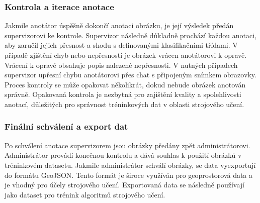 
\subsubsection{Kontrola a iterace anotace}
Jakmile anotátor úspěšně dokončí anotaci obrázku, je její výsledek předán supervizorovi ke kontrole. Supervizor následně důkladně prochází každou anotaci, aby zaručil jejich přesnost a shodu s definovanými klasifikačními třídami. V případě zjištění chyb nebo nepřesností je obrázek vrácen anotátorovi k opravě. Vrácení k opravě obsahuje popis nalezené nepřesnosti. V nutných případech supervizor upřesní chybu anotátorovi přes chat s připojeným snímkem obrazovky. Proces kontroly se může opakovat několikrát, dokud nebude obrázek anotován správně. Opakovaná kontrola je nezbytná pro zajištění kvality a spolehlivosti anotací, důležitých pro správnost tréninkových dat v oblasti strojového učení.

\subsubsection{Finální schválení a export dat}
Po schválení anotace supervizorem jsou obrázky předány zpět administrátorovi. Administrátor provádí konečnou kontrolu a dává souhlas k použití obrázků v tréninkovém datasetu. Jakmile administrátor schválí obrázky, se data vyexportují do formátu GeoJSON. Tento formát je široce využíván pro geoprostorová data a je vhodný pro účely strojového učení. Exportovaná data se následně používají jako dataset pro trénink algoritmů strojového učení.
